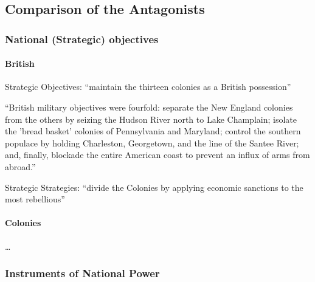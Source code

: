 \subsection{Comparison of the Antagonists}




\subsubsection{National (Strategic) objectives}


\paragraph{British}

Strategic Objectives: ``maintain the thirteen colonies as a British
possession''\cite[2]{moncure_cowpens_1996}

``British military objectives were fourfold: separate the New England colonies
from the others by seizing the Hudson River north to Lake Champlain; isolate the
'bread basket' colonies of Pennsylvania and Maryland; control the southern
populace by holding Charleston, Georgetown, and the line of the Santee River;
and, finally, blockade the entire American coast to prevent an influx of arms
from abroad.''\cite[2]{moncure_cowpens_1996}

Strategic Strategies: ``divide the Colonies by applying economic sanctions to
the most rebellious''\cite[2]{moncure_cowpens_1996}



\paragraph{Colonies}

\ldots

\subsubsection{Instruments of National Power}


